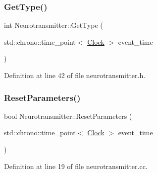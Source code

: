 \mbox{\label{class_neurotransmitter_a45414c0d173758edbbf9318a7eccb623}} 
\subsubsection{\texorpdfstring{Get\+Type()}{GetType()}}
{\footnotesize\ttfamily int Neurotransmitter\+::\+Get\+Type (\begin{DoxyParamCaption}\item[{std\+::chrono\+::time\+\_\+point$<$ \hyperlink{universe_8h_a0ef8d951d1ca5ab3cfaf7ab4c7a6fd80}{Clock} $>$}]{event\+\_\+time }\end{DoxyParamCaption})\hspace{0.3cm}{\ttfamily [inline]}}



Definition at line 42 of file neurotransmitter.\+h.

\mbox{\label{class_neurotransmitter_a6e7650d738bccfbbd49ede10970687aa}} 
\subsubsection{\texorpdfstring{Reset\+Parameters()}{ResetParameters()}}
{\footnotesize\ttfamily bool Neurotransmitter\+::\+Reset\+Parameters (\begin{DoxyParamCaption}\item[{std\+::chrono\+::time\+\_\+point$<$ \hyperlink{universe_8h_a0ef8d951d1ca5ab3cfaf7ab4c7a6fd80}{Clock} $>$}]{event\+\_\+time }\end{DoxyParamCaption})}



Definition at line 19 of file neurotransmitter.\+cc.

